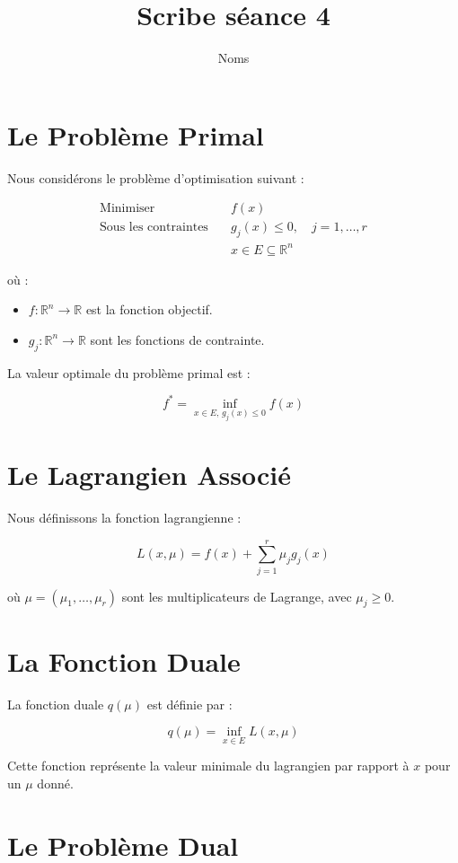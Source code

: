 \documentclass{article}
\title{Scribe séance 4}
\author{Noms}
\begin{document}
\maketitle

\section{Le Problème Primal}

Nous considérons le problème d'optimisation suivant :

\begin{align*}
\text{Minimiser} \quad & f(x) \\
\text{Sous les contraintes} \quad & g_j(x) \leq 0, \quad j = 1, \dotsc, r \\
& x \in E \subseteq \mathbb{R}^n
\end{align*}

où :
\begin{itemize}
    \item $f: \mathbb{R}^n \to \mathbb{R}$ est la fonction objectif.
    \item $g_j: \mathbb{R}^n \to \mathbb{R}$ sont les fonctions de contrainte.
\end{itemize}

La valeur optimale du problème primal est :

\[
f^* = \inf_{x \in E, \, g_j(x) \leq 0} f(x)
\]

\section{Le Lagrangien Associé}

Nous définissons la fonction lagrangienne :

\[
L(x, \mu) = f(x) + \sum_{j=1}^r \mu_j g_j(x)
\]

où $\mu = (\mu_1, \dotsc, \mu_r)$ sont les multiplicateurs de Lagrange, avec $\mu_j \geq 0$.

\section{La Fonction Duale}

La fonction duale $q(\mu)$ est définie par :

\[
q(\mu) = \inf_{x \in E} L(x, \mu)
\]

Cette fonction représente la valeur minimale du lagrangien par rapport à $x$ pour un $\mu$ donné.

\section{Le Problème Dual}
\end{document}
